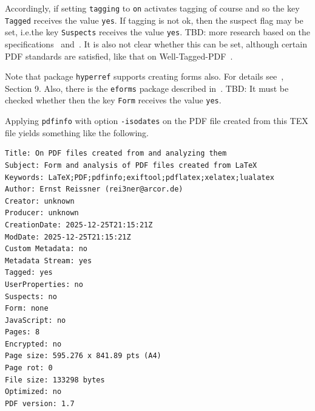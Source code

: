 \documentclass[a4paper, USenglish]{article}%
\makeatletter
\newcommand{\pkg}[1]{\texttt{#1}}%
\newcommand{\pkg}[2][]{\texorpdfstring{\texttt{#2}\sindex[pkg]{#2@\texttt{#2}}}{xxx}} %
\makeatother
\begin{document}
Accordingly, if setting \texttt{tagging} to \texttt{on} activates tagging of course 
and so the key \texttt{Tagged} receives the value \texttt{yes}. 
If tagging is not ok, then the suspect flag may be set, i.e.\@ the key \texttt{Suspects} receives the value \texttt{yes}. 
TBD\@: more research based on the specifications~\cite{Pdf17} and~\cite{Pdf20}. 
It is also not clear whether this can be set, although certain PDF standards are satisfied, 
like that on Well-Tagged-PDF~\cite{WtPDF1}. 


Note that package \pkg{hyperref} supports creating forms also. 
For details see~\cite{HyperTextP}, Section 9. %
Also, there is the \texttt{eforms} package described in~\cite{eformP}. 
TBD\@: It must be checked whether then the key \texttt{Form} receives the value \texttt{yes}. 

 
 





Applying \texttt{pdfinfo} with option \texttt{-isodates} on the PDF file created from this TEX file yields 
something like the following. \\

\noindent
\begin{verbatim}
Title: On PDF files created from and analyzing them
Subject: Form and analysis of PDF files created from LaTeX
Keywords: LaTeX;PDF;pdfinfo;exiftool;pdflatex;xelatex;lualatex
Author: Ernst Reissner (rei3ner@arcor.de)
Creator: unknown
Producer: unknown
CreationDate: 2025-12-25T21:15:21Z
ModDate: 2025-12-25T21:15:21Z
Custom Metadata: no
Metadata Stream: yes
Tagged: yes
UserProperties: no
Suspects: no
Form: none
JavaScript: no
Pages: 8
Encrypted: no
Page size: 595.276 x 841.89 pts (A4)
Page rot: 0
File size: 133298 bytes
Optimized: no
PDF version: 1.7
\end{verbatim}
\end{document}
